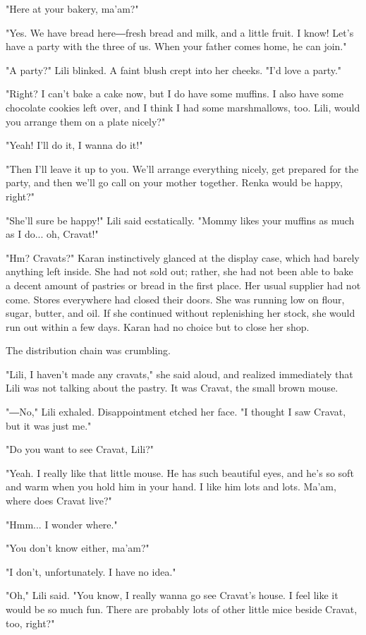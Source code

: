"Here at your bakery, ma'am?"

"Yes. We have bread here―fresh bread and milk, and a little fruit. I
know! Let's have a party with the three of us. When your father comes
home, he can join."

"A party?" Lili blinked. A faint blush crept into her cheeks. "I'd love
a party."

"Right? I can't bake a cake now, but I do have some muffins. I also have
some chocolate cookies left over, and I think I had some marshmallows,
too. Lili, would you arrange them on a plate nicely?"

"Yeah! I'll do it, I wanna do it!"

"Then I'll leave it up to you. We'll arrange everything nicely, get
prepared for the party, and then we'll go call on your mother together.
Renka would be happy, right?"

"She'll sure be happy!" Lili said ecstatically. "Mommy likes your
muffins as much as I do... oh, Cravat!"

"Hm? Cravats?" Karan instinctively glanced at the display case, which
had barely anything left inside. She had not sold out; rather, she had
not been able to bake a decent amount of pastries or bread in the first
place. Her usual supplier had not come. Stores everywhere had closed
their doors. She was running low on flour, sugar, butter, and oil. If
she continued without replenishing her stock, she would run out within a
few days. Karan had no choice but to close her shop.

The distribution chain was crumbling.

"Lili, I haven't made any cravats," she said aloud, and realized
immediately that Lili was not talking about the pastry. It was Cravat,
the small brown mouse.

"―No," Lili exhaled. Disappointment etched her face. "I thought I saw
Cravat, but it was just me."

"Do you want to see Cravat, Lili?"

"Yeah. I really like that little mouse. He has such beautiful eyes, and
he's so soft and warm when you hold him in your hand. I like him lots
and lots. Ma'am, where does Cravat live?"

"Hmm... I wonder where."

"You don't know either, ma'am?"

"I don't, unfortunately. I have no idea."

"Oh," Lili said. "You know, I really wanna go see Cravat's house. I feel
like it would be so much fun. There are probably lots of other little
mice beside Cravat, too, right?"

